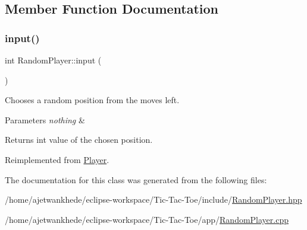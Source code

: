 \subsection{Member Function Documentation}
\mbox{\label{classRandomPlayer_a4b252647e976a08c1717d8db78bec23d}} 
\subsubsection{\texorpdfstring{input()}{input()}}
{\footnotesize\ttfamily int Random\+Player\+::input (\begin{DoxyParamCaption}{ }\end{DoxyParamCaption})\hspace{0.3cm}{\ttfamily [virtual]}}



Chooses a random position from the moves left. 


\begin{DoxyParams}{Parameters}
{\em nothing} & \\
\hline
\end{DoxyParams}
\begin{DoxyReturn}{Returns}
int value of the chosen position. 
\end{DoxyReturn}


Reimplemented from \mbox{\hyperlink{classPlayer_a3e7c5ce7c59c8b5cc9d0b985a1baae91}{Player}}.



The documentation for this class was generated from the following files\+:\begin{DoxyCompactItemize}
\item 
/home/ajetwankhede/eclipse-\/workspace/\+Tic-\/\+Tac-\/\+Toe/include/\mbox{\hyperlink{RandomPlayer_8hpp}{Random\+Player.\+hpp}}\item 
/home/ajetwankhede/eclipse-\/workspace/\+Tic-\/\+Tac-\/\+Toe/app/\mbox{\hyperlink{RandomPlayer_8cpp}{Random\+Player.\+cpp}}\end{DoxyCompactItemize}
